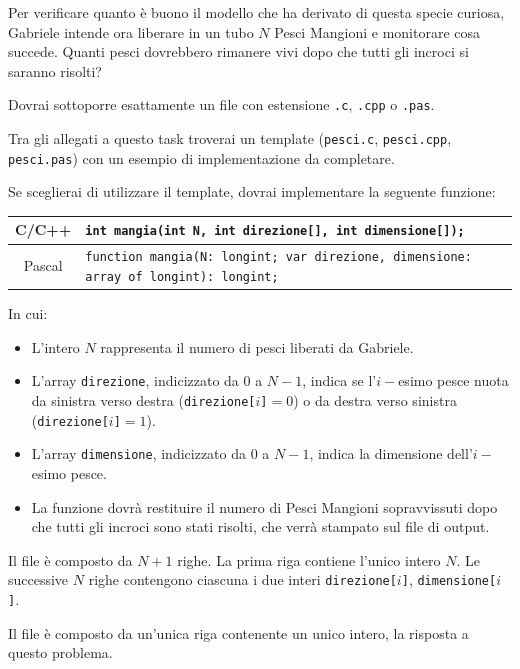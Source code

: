 Per verificare quanto è buono il modello che ha derivato di questa specie curiosa, Gabriele intende ora liberare in un tubo $N$ Pesci Mangioni e monitorare cosa succede. Quanti pesci dovrebbero rimanere vivi dopo che tutti gli incroci si saranno risolti?

\Implementation
Dovrai sottoporre esattamente un file con estensione \texttt{.c}, \texttt{.cpp} o \texttt{.pas}.

\begin{warning}
Tra gli allegati a questo task troverai un template (\texttt{pesci.c}, \texttt{pesci.cpp}, \texttt{pesci.pas}) con un esempio di implementazione da completare.
\end{warning}

Se sceglierai di utilizzare il template, dovrai implementare la seguente funzione:
\begin{center}\begin{tabularx}{\textwidth}{|c|X|}
\hline
C/C++  & \verb|int mangia(int N, int direzione[], int dimensione[]);|\\
\hline
Pascal & \small\verb|function mangia(N: longint; var direzione, dimensione: array of longint): longint;|\\
\hline
\end{tabularx}\end{center}
In cui:
\begin{itemize}[nolistsep]
  \item L'intero $N$ rappresenta il numero di pesci liberati da Gabriele.
  \item L'array \texttt{direzione}, indicizzato da $0$ a $N-1$, indica se l'$i-$esimo pesce nuota da sinistra verso destra (\texttt{direzione[$i$]}$= 0$) o da destra verso sinistra (\texttt{direzione[$i$]}$= 1$).
  \item L'array \texttt{dimensione}, indicizzato da $0$ a $N-1$, indica la dimensione dell'$i-$esimo pesce.
  \item La funzione dovrà restituire il numero di Pesci Mangioni sopravvissuti dopo che tutti gli incroci sono stati risolti, che verrà stampato sul file di output.
\end{itemize}

\InputFile
Il file  è composto da $N+1$ righe. La prima riga contiene l'unico intero $N$. Le successive $N$ righe contengono ciascuna i due interi \texttt{direzione[$i$]}, \texttt{dimensione[$i$]}.

\OutputFile
Il file \outputfile{} è composto da un'unica riga contenente un unico intero, la risposta a questo problema.

